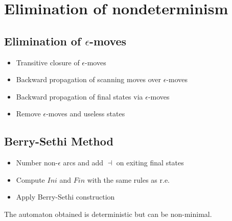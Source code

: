 \section{Elimination of nondeterminism}

\subsection{Elimination of $\epsilon$-moves}
\begin{itemize}
    \item Transitive closure of $\epsilon$-moves
    \item Backward propagation of scanning moves over $\epsilon$-moves
    \item Backward propagation of final states via $\epsilon$-moves
    \item Remove $\epsilon$-moves and useless states
\end{itemize}

\subsection{Berry-Sethi Method}
\begin{itemize}
    \item Number non-$\epsilon$ arcs and add $\dashv$ on exiting final states
    \item Compute $Ini$ and $Fin$ with the same rules as r.e.
    \item Apply Berry-Sethi construction
\end{itemize}
The automaton obtained is deterministic but can be non-minimal.
